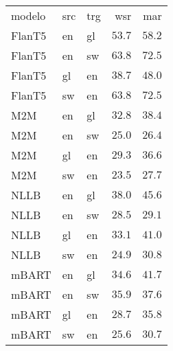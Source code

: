 \begin{tabular}{lllrr}
modelo & src & trg & wsr & mar \\
FlanT5 & en & gl & $53.7$ & $58.2$ \\
FlanT5 & en & sw & $63.8$ & $72.5$ \\
FlanT5 & gl & en & $38.7$ & $48.0$ \\
FlanT5 & sw & en & $63.8$ & $72.5$ \\
M2M & en & gl & $32.8$ & $38.4$ \\
M2M & en & sw & $25.0$ & $26.4$ \\
M2M & gl & en & $29.3$ & $36.6$ \\
M2M & sw & en & $23.5$ & $27.7$ \\
NLLB & en & gl & $38.0$ & $45.6$ \\
NLLB & en & sw & $28.5$ & $29.1$ \\
NLLB & gl & en & $33.1$ & $41.0$ \\
NLLB & sw & en & $24.9$ & $30.8$ \\
mBART & en & gl & $34.6$ & $41.7$ \\
mBART & en & sw & $35.9$ & $37.6$ \\
mBART & gl & en & $28.7$ & $35.8$ \\
mBART & sw & en & $25.6$ & $30.7$ \\
\end{tabular}
